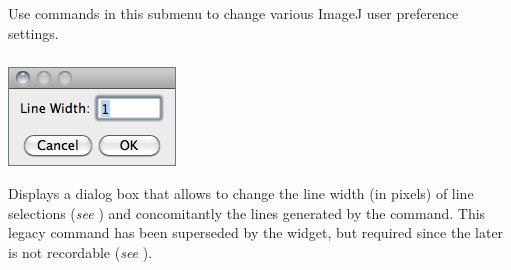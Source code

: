 \subsection{\protect{}\label{sub:Options}}

Use commands in this submenu to change various ImageJ user preference
settings. 


\subsubsection{\protect{}\label{sub:Line-Width...}}

\begin{minipage}[c][1\totalheight][t]{0.26\columnwidth}%
\includegraphics[scale=0.55]{images/LineWidth1}%
\end{minipage}%
\begin{minipage}[c][1\totalheight][t]{0.74\columnwidth}%
Displays a dialog box that allows to change the line width (in pixels)
of line selections (\emph{see} )
and concomitantly the lines generated by the 
command. This legacy command has been superseded by the 
widget, but required since the later is not recordable (\emph{see}
).%
\end{minipage}


\subsubsection[\protect\userinterface{Input/Output\ldots{}}]{\protect{}\label{sub:Input/Output...}\improvement{}}

